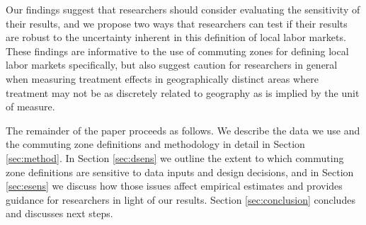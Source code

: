 Our findings suggest that researchers should consider evaluating the sensitivity of their results, and we propose two ways that researchers can test if their results are robust to the uncertainty inherent in this definition of local labor markets. These findings are informative to the use of commuting zones for defining local labor markets specifically, but also suggest caution for researchers in general when measuring treatment effects in geographically distinct areas where treatment may not be as discretely related to geography as is implied by the unit of measure. 

The remainder of the paper proceeds as follows. We describe the data we use and the commuting zone definitions and methodology in detail in Section \ref{sec:method}. In Section \ref{sec:dsens} we outline the extent to which commuting zone definitions are sensitive to data inputs and design decisions, and in Section \ref{sec:esens} we discuss how those issues affect empirical estimates and provides guidance for researchers in light of our results. Section \ref{sec:conclusion} concludes and discusses next steps. 


